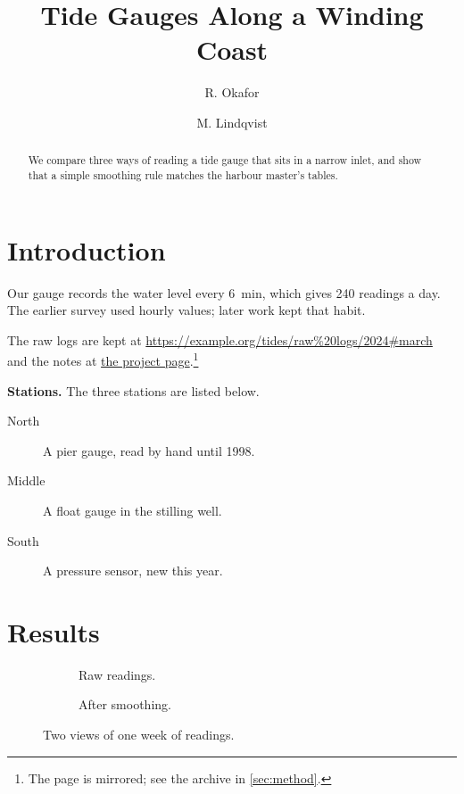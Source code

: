 \documentclass[11pt]{article}
\title{Tide Gauges Along a Winding Coast}
\author{R. Okafor \and M. Lindqvist}
\date{}
\begin{document}
\maketitle

\begin{abstract}
We compare three ways of reading a tide gauge that sits in a narrow inlet, and
show that a simple smoothing rule matches the harbour master's tables.
\end{abstract}

\section{Introduction}\label{sec:intro}
Our gauge records the water level every \SI{6}{\minute}, which gives
\num{240} readings a day. The earlier survey \citep[see][p.~3]{harbour94} used
hourly values; later work \citealp{inlet07,quay12} kept that habit.

The raw logs are kept at \url{https://example.org/tides/raw%20logs/2024#march}
and the notes at \href{https://example.org/tides/notes%20v2}{the project page}.\footnote{The
page is mirrored; see the archive in \cref{sec:method}.}

{\bf Stations.} The three stations are listed below.
\begin{description}
  \item[North] A pier gauge, read by hand until 1998.
  \item[Middle] A float gauge in the stilling well.
  \item[South] A pressure sensor, new this year.
\end{description}



\section{Results}\label{sec:results}
\begin{figure}[ht]
  \centering
  \begin{subfigure}[b]{0.45\textwidth}
    \centering
    \caption{Raw readings.}\label{fig:raw}
  \end{subfigure}\hfill
  \begin{subfigure}[b]{0.45\textwidth}
    \centering
    \caption{After smoothing.}\label{fig:smooth}
  \end{subfigure}
  \caption{Two views of one week of readings.}\label{fig:both}
\end{figure}
\end{document}
